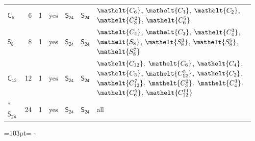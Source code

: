 \documentclass[10pt,a4paper]{article}
\newcommand{\needspace}[1]{\par\penalty-100\begingroup\dimen0=#1\relax\dimen2=\pagegoal
  \advance\dimen2-\pagetotal\ifdim\dimen0>\dimen2\relax\ifdim\dimen2>0pt\vfil\break\fi\fi
  \endgroup}
\numberwithin{equation}{section}
\newcommand{\eltfont}[1]{{\let\sigma\eltsigma\mathelt{#1}}}
\newcommand{\grp}[1]{\mathsf{#1}}
\newcommand{\cls}[1]{\eltfont{#1}}
\newlength{\fillwidth}\newlength{\cellwidth}\newlength{\colwidth}
\begin{document}
{\begin{longtable}{@{}lrrlll>{\RaggedRight\arraybackslash}p{\fillwidth}@{}}
\href{C6.pdf}{$\grp{C_{6}}$} & 6 & 1 & yes & \href{S24.pdf}{$\grp{S_{24}}$} & \href{S24.pdf}{$\grp{S_{24}}$} & $\cls{C_{6}}$, $\cls{C_{3}}$, $\cls{C_{2}}$, $\cls{C_{3}^{2}}$, $\cls{C_{6}^{5}}$\\
\href{S8.pdf}{$\grp{S_{8}}$} & 8 & 1 & yes & \href{S24.pdf}{$\grp{S_{24}}$} & \href{S24.pdf}{$\grp{S_{24}}$} & $\cls{C_{4}}$, $\cls{C_{2}}$, $\cls{C_{4}^{3}}$, $\cls{S_{8}}$, $\cls{S_{8}^{3}}$, $\cls{S_{8}^{5}}$, $\cls{S_{8}^{7}}$\\
\href{C12.pdf}{$\grp{C_{12}}$} & 12 & 1 & yes & \href{S24.pdf}{$\grp{S_{24}}$} & \href{S24.pdf}{$\grp{S_{24}}$} & $\cls{C_{12}}$, $\cls{C_{6}}$, $\cls{C_{4}}$, $\cls{C_{3}}$, $\cls{C_{12}^{5}}$, $\cls{C_{2}}$, $\cls{C_{12}^{7}}$, $\cls{C_{3}^{2}}$, $\cls{C_{4}^{3}}$, $\cls{C_{6}^{5}}$, $\cls{C_{12}^{11}}$\\*
\href{S24.pdf}{$\grp{S_{24}}$} & 24 & 1 & yes & \href{S24.pdf}{$\grp{S_{24}}$} & \href{S24.pdf}{$\grp{S_{24}}$} & all\\
\bottomrule\end{longtable}}
\needspace{103pt}
\end{document}
